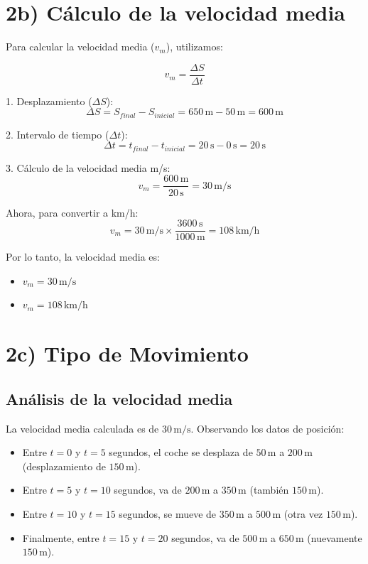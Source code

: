 \documentclass{article}
\begin{document}
\section*{2b) Cálculo de la velocidad media}

Para calcular la velocidad media (\(v_m\)), utilizamos:

\[
v_m = \frac{\Delta S}{\Delta t}
\]

1. Desplazamiento (\(\Delta S\)):
   \[
   \Delta S = S_{final} - S_{inicial} = 650 \, \text{m} - 50 \, \text{m} = 600 \, \text{m}
   \]

2. Intervalo de tiempo (\(\Delta t\)):
   \[
   \Delta t = t_{final} - t_{inicial} = 20 \, \text{s} - 0 \, \text{s} = 20 \, \text{s}
   \]

3. Cálculo de la velocidad media m/s:
\[
v_m = \frac{600 \, \text{m}}{20 \, \text{s}} = \boxed{30 \, \text{m/s}}
\]

Ahora, para convertir a km/h:
\[
v_m = 30 \, \text{m/s} \times \frac{3600 \, \text{s}}{1000 \, \text{m}} = \boxed{108 \, \text{km/h}}
\]

Por lo tanto, la velocidad media es:

\begin{itemize}
    \item \(v_m = 30 \, \text{m/s}\)
    \item \(v_m = 108 \, \text{km/h}\)
\end{itemize}


\section*{2c) Tipo de Movimiento}

\subsection*{Análisis de la velocidad media}

La velocidad media calculada es de \(30 \, \text{m/s}\). Observando los datos de posición:

\begin{itemize}
    \item Entre \(t = 0\) y \(t = 5\) segundos, el coche se desplaza de \(50 \, \text{m}\) a \(200 \, \text{m}\) (desplazamiento de \(150 \, \text{m}\)).
    \item Entre \(t = 5\) y \(t = 10\) segundos, va de \(200 \, \text{m}\) a \(350 \, \text{m}\) (también \(150 \, \text{m}\)).
    \item Entre \(t = 10\) y \(t = 15\) segundos, se mueve de \(350 \, \text{m}\) a \(500 \, \text{m}\) (otra vez \(150 \, \text{m}\)).
    \item Finalmente, entre \(t = 15\) y \(t = 20\) segundos, va de \(500 \, \text{m}\) a \(650 \, \text{m}\) (nuevamente \(150 \, \text{m}\)).
\end{itemize}
\end{document}

